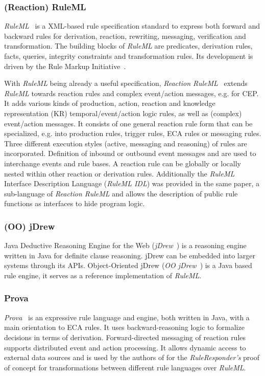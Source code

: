 \documentclass[11pt]{article}%
\begin{document}
\subsubsection{(Reaction) RuleML}
\textit{RuleML}~\cite{2006-Boley-RuleML.pdf} is a XML-based rule specification standard to express both forward and backward rules for derivation, reaction, rewriting, messaging, verification and transformation. The building blocks of \textit{RuleML} are predicates, derivation rules, facts, queries, integrity constraints and transformation rules. Its development is driven by the Rule Markup Initiative~\cite{wwwruleml}.

With \textit{RuleML} being already a useful specification, \textit{Reaction RuleML}~\cite{2012-Paschke_etal-ReactionRuleML.pdf} extends \textit{RuleML} towards reaction rules and complex event/action messages, e.g. for CEP. It adds various kinds of production, action, reaction and knowledge representation (KR) temporal/event/action logic rules, as well as (complex) event/action messages. It consists of one general reaction rule form that can be specialized, e.g. into production rules, trigger rules, ECA rules or messaging rules. Three different execution styles (active, messaging and reasoning) of rules are incorporated. Definition of inbound or outbound event messages and are used to interchange events and rule bases. A reaction rule can be globally or locally nested within other reaction or derivation rules. Additionally the \emph{RuleML} Interface Description Language (\textit{RuleML IDL}) was provided in the same paper, a sub-language of \textit{Reaction RuleML} and allows the description of public rule functions as interfaces to hide program logic.

\subsubsection{(OO) jDrew}
Java Deductive Reasoning Engine for the Web (\emph{jDrew}~\cite{wwwjdrew}) is a reasoning engine written in Java for definite clause reasoning. jDrew can be embedded into larger systems through its APIs.
Object-Oriented jDrew (\emph{OO jDrew}~\cite{2005-Ball_etal-OOjDrew.pdf,wwwoojdrew}) is a Java based rule engine, it serves as a reference implementation of \emph{RuleML}.

\subsubsection{Prova}
\emph{Prova}~\cite{wwwprova} is an expressive rule language and engine, both written in Java, with a main orientation to ECA rules. It uses backward-reasoning logic to formalize decisions in terms of derivation. Forward-directed messaging of reaction rules supports distributed event and action processing. It allows dynamic access to external data sources and is used by the authors of \cite{2013_Zhao-Paschke_EDSWE.pdf,2007-Paschke_etal-RuleResponder.pdf} for the \emph{RuleResponder's} proof of concept for transformations between different rule languages over \emph{RuleML}.
\end{document}
